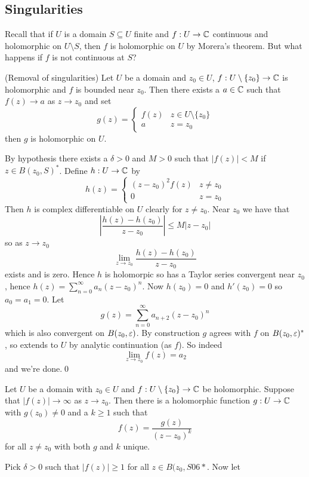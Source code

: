 \documentclass{article}
\begin{document}
\subsection{Singularities}
Recall that if $ U $ is a domain $ S\subseteq U $ finite and $ f:U\to\mathbb{C} $ continuous and holomorphic on $ U\setminus S $, then $ f $ is holomorphic on $ U $ by Morera's theorem. But what happens if $ f $ is not continuous at $ S $?
\begin{proposition}
	(Removal of singularities) Let $ U $ be a domain and $ z_0 \in U $, $ f:U\setminus \{z_0\} \to \mathbb{C} $ is holomorphic and $ f $ is bounded near $ z_0 $. Then there exists a $ a\in \mathbb{C} $ such that $ f(z) \to a $ as $ z\to z_0 $ and set 
	\[
	  g(z) = \begin{cases}
		  f(z) & z\in U\setminus \{z_0\}\\
		  a & z=z_0
	  \end{cases}
	\]
	then $ g $ is holomorphic on $ U $.
\end{proposition}
By hypothesis there exists a $ \delta >0 $ and $ M>0 $ such that $ |f(z)|< M $ if $ z\in B(z_0,S)^* $. Define $ h:U\to\mathbb{C} $ by
\[
  h(z) =\begin{cases}
	  (z-z_0)^2f(z) & z \ne z_0 \\
	  0 & z= z_0
  \end{cases}
\]
Then $ h $ is complex differentiable on $ U $ clearly for $ z\ne z_0 $. Near $ z_0 $ we have that
\[
	\left|\frac {h(z) - h(z_0)}{z-z_0}\right| \le M|z-z_0|
\]
so as $ z\to z_0 $
\[
\lim_{z\to z_0} \frac{h(z)-h(z_0)}{z-z_0}
\]
exists and is zero. Hence $ h $ is holomorpic so has a Taylor series convergent near $ z_0 $, hence $ h(z) = \sum_{n=0}^\infty a_n(z-z_0)^n $. Now $ h(z_0)= 0 $ and $ h'(z_0) = 0 $ so $ a_0=a_1=0 $. Let 
\[
	g(z) = \sum_{n=0}^\infty a_{n+2}(z-z_0)^n
\]
which is also convergent on $ B(z_0,\varepsilon) $. By construction $ g $ agrees with $ f $ on $ B(z_0,\varepsilon)^* $, so extends to $ U $ by analytic continuation (as $ f $). So indeed
\[
	\lim_{z\to z_0} f(z) = a_2
\]
and we're done.\qed
\begin{proposition}
	Let $ U $ be a domain with $ z_0\in U $ and $ f:U\setminus \{z_0\}\to \mathbb{C} $ be holomorphic. Suppose that $ |f(z)|\to \infty $ as $ z\to z_0 $. Then there is a holomorphic function $ g:U\to \mathbb{C} $ with $ g(z_0)\ne 0 $ and a $ k\ge 1 $ such that
	\[
		f(z) = \frac{g(z)}{(z-z_0)^k}
	\]
	for all $ z\ne z_0 $ with both $ g $ and $ k $ unique.
\end{proposition}
\pf Pick $ \delta>0 $ such that $ |f(z)|\ge 1 $ for all $ z\in B(z_0,S06* $. Now let 
\end{document}
